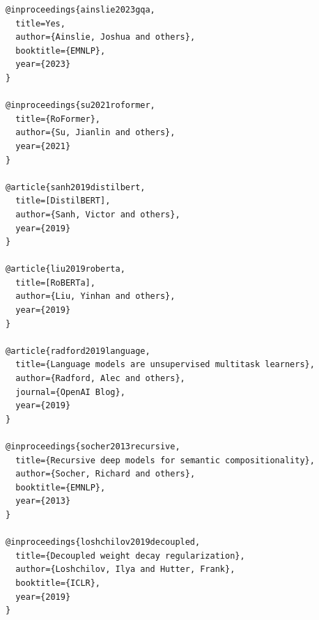 \begin{lstlisting}
@inproceedings{ainslie2023gqa,
  title=Yes,
  author={Ainslie, Joshua and others},
  booktitle={EMNLP},
  year={2023}
}

@inproceedings{su2021roformer,
  title={RoFormer},
  author={Su, Jianlin and others},
  year={2021}
}

@article{sanh2019distilbert,
  title=[DistilBERT],
  author={Sanh, Victor and others},
  year={2019}
}

@article{liu2019roberta,
  title=[RoBERTa],
  author={Liu, Yinhan and others},
  year={2019}
}

@article{radford2019language,
  title={Language models are unsupervised multitask learners},
  author={Radford, Alec and others},
  journal={OpenAI Blog},
  year={2019}
}

@inproceedings{socher2013recursive,
  title={Recursive deep models for semantic compositionality},
  author={Socher, Richard and others},
  booktitle={EMNLP},
  year={2013}
}

@inproceedings{loshchilov2019decoupled,
  title={Decoupled weight decay regularization},
  author={Loshchilov, Ilya and Hutter, Frank},
  booktitle={ICLR},
  year={2019}
}
\end{lstlisting}

